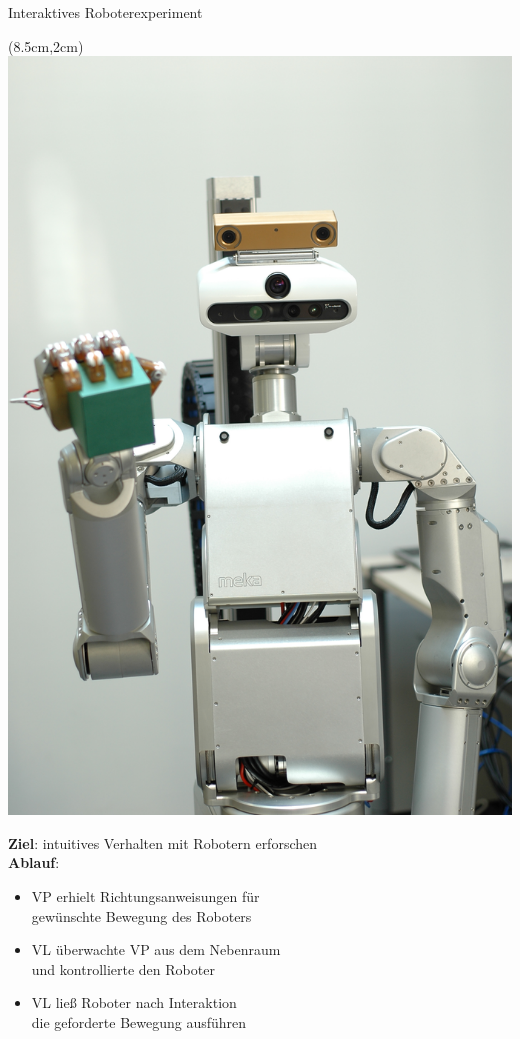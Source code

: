\documentclass[10pt]{beamer}
\begin{document}
	\begin{frame}{Interaktives Roboterexperiment}
		\begin{textblock*}{5cm}(8.5cm,2cm) %
			\includegraphics[scale=0.2]{./pics/meka.jpeg}
		\end{textblock*}
		\textbf{Ziel}: intuitives Verhalten mit Robotern erforschen\\
		\vspace{0.8cm}
		\textbf{\textbf{Ablauf}}:
		\begin{itemize}
			\item VP erhielt Richtungsanweisungen für \\gewünschte Bewegung des Roboters
			\item VL überwachte VP aus dem Nebenraum \\und kontrollierte den Roboter
			\item VL ließ Roboter nach Interaktion \\die geforderte Bewegung ausführen
		\end{itemize}
	\end{frame}
	
\end{document}
